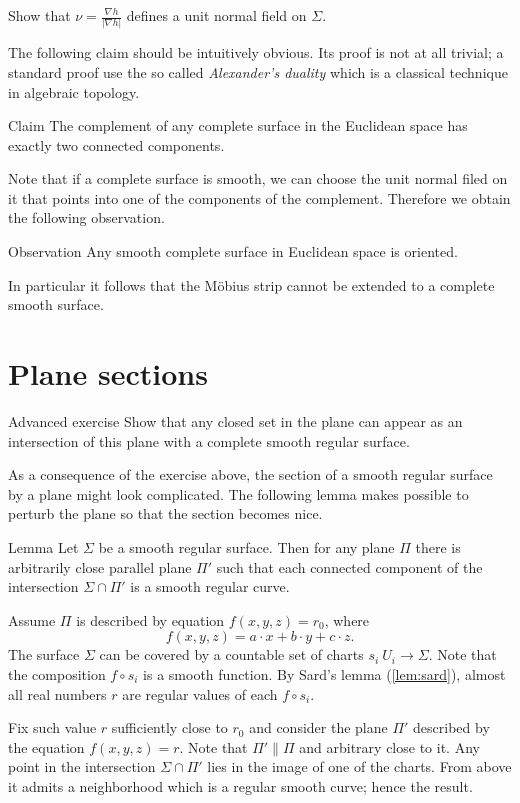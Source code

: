  Show that $\nu=\tfrac{\nabla h}{|\nabla h|}$ defines a unit normal field on $\Sigma$.

The following claim should be intuitively obvious. 
Its proof is not at all trivial; a standard proof use the so called \emph{Alexander's duality} which is a classical technique in algebraic topology.

\begin{thm}{Claim}
The complement of any complete surface in the Euclidean space has exactly two connected components. 
\end{thm}

Note that if a complete surface is smooth, we can choose the unit normal filed on it that points into one of the components of the complement.
Therefore we obtain the following observation. 

\begin{thm}{Observation}
Any smooth complete surface in Euclidean space is oriented.
\end{thm}

In particular it follows that the M\"obius strip cannot be extended to a complete smooth surface.

\section*{Plane sections}

\begin{thm}{Advanced exercise}
Show that any closed set in the plane can appear as an intersection of this plane with a complete smooth regular surface.  
\end{thm}

As a consequence of the exercise above, the section of a smooth regular surface by a plane might look complicated.
The following lemma makes possible to perturb the plane so that the section becomes nice. 

\begin{thm}{Lemma}\label{lem:reg-section}
Let $\Sigma$ be a smooth regular surface.
Then for any plane $\Pi$ there is arbitrarily close parallel plane $\Pi'$ such that 
each connected component of the intersection $\Sigma\cap \Pi'$ is a smooth regular curve.
\end{thm}

Assume $\Pi$ is described by equation $f(x,y,z)=r_0$, where
\[f(x,y,z)=a\cdot x+b\cdot y+c\cdot z.\] 
The surface $\Sigma$ can be covered by a countable set of charts $s_i\:U_i\to \Sigma$.
Note that the composition $f\circ s_i$ is a smooth function.
By Sard's lemma (\ref{lem:sard}), almost all real numbers $r$ are regular values of each $f\circ s_i$.

Fix such value $r$ sufficiently close to $r_0$ and consider the plane $\Pi'$ described by the equation $f(x,y,z)=r$.
Note that $\Pi'\parallel \Pi$ and arbitrary close to it.
Any point in the intersection $\Sigma\cap\Pi'$ lies in the image of one of the charts.
From above it admits a neighborhood which is a regular smooth curve;
hence the result.\qeds


